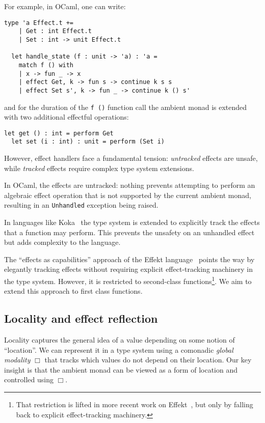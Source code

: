 \documentclass[acmsmall, screen, review, anonymous]{acmart}
\theoremstyle{definition}
\newcommand{\glob}{\mathop{\Box}}
\begin{document}
For example, in OCaml, one can write:
\begin{lstlisting}[style=oxcaml]
  type 'a Effect.t +=
    | Get : int Effect.t
    | Set : int -> unit Effect.t

  let handle_state (f : unit -> 'a) : 'a =
    match f () with
    | x -> fun _ -> x
    | effect Get, k -> fun s -> continue k s s
    | effect Set s', k -> fun _ -> continue k () s'
\end{lstlisting}
and for the duration of the \lstinline[style=oxcaml]{f ()} function call
the ambient monad is extended with two additional effectful operations:
\begin{lstlisting}[style=oxcaml]
  let get () : int = perform Get
  let set (i : int) : unit = perform (Set i)
\end{lstlisting}

However, effect handlers face a fundamental tension: \emph{untracked}
effects are unsafe, while \emph{tracked} effects require complex type
system extensions.

In OCaml, the effects are untracked: nothing prevents attempting to
perform an algebraic effect operation that is not supported by the
current ambient monad, resulting in an
\lstinline[style=oxcaml]{Unhandled} exception being raised.

In languages like Koka~\cite{leijen2017type} the type system is extended
to explicitly track the effects that a function may perform. This
prevents the unsafety on an unhandled effect but adds complexity to the
language.

The ``effects as capabilities'' approach of the Effekt
language~\cite{brachthauser2020effects} points the way by elegantly
tracking effects without requiring explicit effect-tracking machinery in
the type system. However, it is restricted to second-class
functions\footnote{That restriction is lifted in more recent work on Effekt~\cite{brachthauser2022effects}, but only by falling back to explicit
effect-tracking machinery.}. We aim to extend this approach to first
class functions.

\subsection{Locality and effect reflection}
Locality captures the general idea of a value depending on some notion
of ``location''. We can represent it in a type system using a comonadic
\emph{global modality} $\glob$ that tracks which values do not depend on
their location. Our key insight is that the ambient monad can be viewed
as a form of location and controlled using $\glob$.
\end{document}

